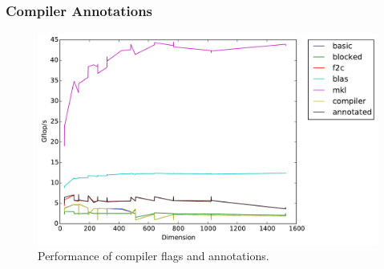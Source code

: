 
\subsubsection{Compiler Annotations}

\begin{figure}[h]
  \centering
  \includegraphics[width=\textwidth]{timing_compiler.pdf}
  \caption{Performance of compiler flags and annotations.}
  \label{fig:compiler}
\end{figure}
